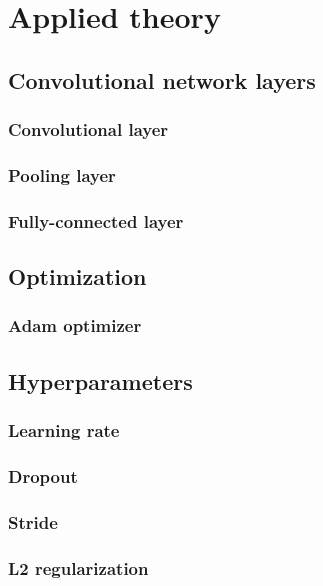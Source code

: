 \chapter{Applied theory}
\label{chp:theory}

\section{Convolutional network layers}

\subsection{Convolutional layer}

\subsection{Pooling layer}

\subsection{Fully-connected layer}


\section{Optimization}

\subsection{Adam optimizer}


\section{Hyperparameters}

\subsection{Learning rate}

\subsection{Dropout}

\subsection{Stride}

\subsection{L2 regularization}


